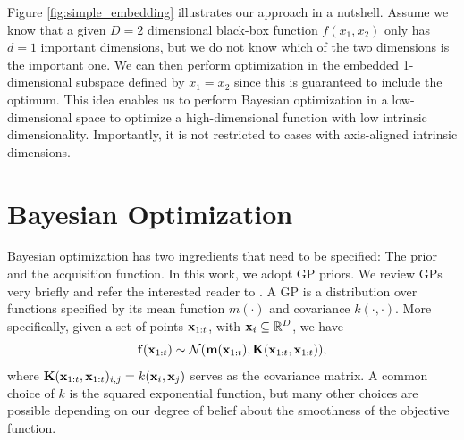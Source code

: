 \documentclass{article}
\begin{document}
Figure \ref{fig:simple_embedding} illustrates our approach in a nutshell.
Assume we know that a given $D=2$ dimensional black-box function $f(x_1, x_2)$ only has $d=1$ important dimensions, but we do not know which of the two dimensions is the important one.
We can then perform optimization in the embedded 1-dimensional subspace defined by $x_1=x_2$ since this is guaranteed to include the optimum. 
This idea enables us to perform Bayesian optimization in a low-dimensional space to
optimize a high-dimensional function with low intrinsic dimensionality. 
Importantly, it is not restricted to cases with axis-aligned intrinsic dimensions.
%
%






\section{Bayesian Optimization}\label{sec:bo}

Bayesian optimization has two ingredients that need to be specified: The prior and the acquisition function. In this work, we adopt GP priors. We review GPs very briefly and refer the interested reader to \cite{Rasmussen:2006}.
A GP is a distribution over functions specified by its mean function $m(\cdot)$ and covariance $k(\cdot,\cdot)$. More specifically, given a set of points $\mathbf{x}_{1:t}$, with $\mathbf{x}_i \subseteq \mathbb{R}^D$, we have 
$$
\mathbf{f}(\mathbf{x}_{1:t}) \sim \mathcal{N}(\mathbf{m}(\mathbf{x}_{1:t}), \mathbf{K}(\mathbf{x}_{1:t}, \mathbf{x}_{1:t})),
$$
where $\mathbf{K}(\mathbf{x}_{1:t}, \mathbf{x}_{1:t})_{i,j} = k(\mathbf{x}_i, \mathbf{x}_j)$
serves as the covariance matrix. A common choice of $k$ is the squared exponential function,
but many other choices are possible depending on our degree of belief about the smoothness of the objective function.
\end{document}
